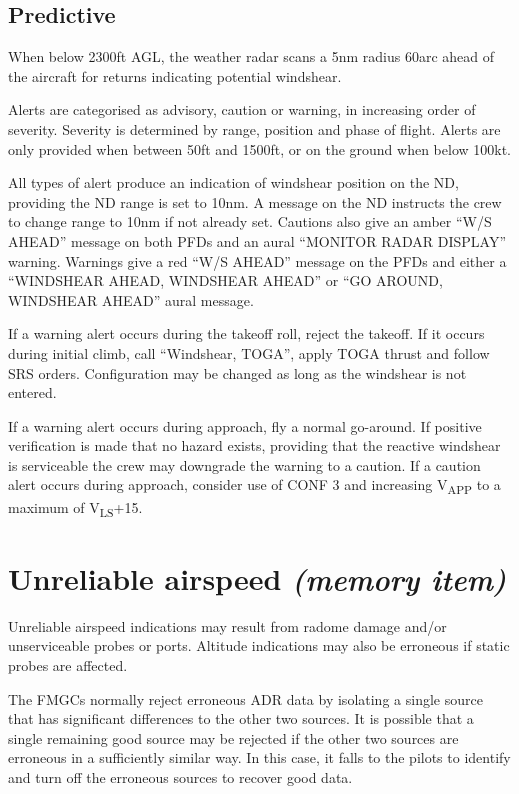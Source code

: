 \documentclass[a5paper,11pt,twoside]{book}
\newcommand{\multicite}[1]{
  \nopagebreak
  \noindent{\footnotesize\color{blue}{[ #1 ]}}
}
\newcommand{\V}[1]{V\textsubscript{#1}}
\begin{document}
\multicite{FCOM~PRO.AEP.SURV}

\subsection{Predictive}

When below 2300ft AGL, the weather radar scans a 5nm radius 60\textdegree{ }arc ahead of the
aircraft for returns indicating potential windshear.

Alerts are categorised as advisory, caution or warning, in increasing order of
severity. Severity is determined by range, position and phase of flight. Alerts
are only provided when between 50ft and 1500ft, or on the ground when below
100kt.

All types of alert produce an indication of windshear position on the ND,
providing the ND range is set to 10nm. A message on the ND instructs the crew to
change range to 10nm if not already set. Cautions also give an amber “W/S AHEAD”
message on both PFDs and an aural “MONITOR RADAR DISPLAY” warning. Warnings give
a red “W/S AHEAD” message on the PFDs and either a “WINDSHEAR AHEAD, WINDSHEAR
AHEAD” or “GO AROUND, WINDSHEAR AHEAD” aural message.

If a warning alert occurs during the takeoff roll, reject the takeoff. If it
occurs during initial climb, call “Windshear, TOGA”, apply TOGA thrust and
follow SRS orders. Configuration may be changed as long as the windshear is not
entered.

If a warning alert occurs during approach, fly a normal go-around. If positive
verification is made that no hazard exists, providing that the reactive
windshear is serviceable the crew may downgrade the warning to a caution. If a
caution alert occurs during approach, consider use of CONF 3 and increasing
\V{APP} to a maximum of \V{LS}+15.

\multicite{FCOM~PRO.AES.SURV}

\section{Unreliable airspeed \emph{(memory item)}}

Unreliable airspeed indications may result from radome damage and/or
unserviceable probes or ports. Altitude indications may also be erroneous if
static probes are affected.

The FMGCs normally reject erroneous ADR data by isolating a single source that
has significant differences to the other two sources. It is possible that a
single remaining good source may be rejected if the other two sources are
erroneous in a sufficiently similar way. In this case, it falls to the pilots to
identify and turn off the erroneous sources to recover good data.
\end{document}
